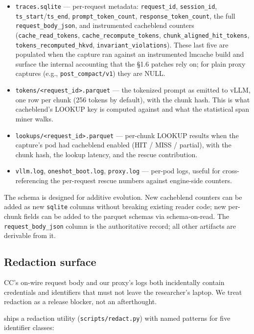 \begin{itemize}
\item \texttt{traces.sqlite} --- per-request metadata: \texttt{request\_id},
  \texttt{session\_id}, \texttt{ts\_start}/\texttt{ts\_end},
  \texttt{prompt\_token\_count}, \texttt{response\_token\_count}, the
  full \texttt{request\_body\_json}, and instrumented cacheblend
  counters (\texttt{cache\_read\_tokens},
  \texttt{cache\_recompute\_tokens},
  \texttt{chunk\_aligned\_hit\_tokens},
  \texttt{tokens\_recomputed\_hkvd},
  \texttt{invariant\_violations}). These last five are populated when
  the capture ran against an instrumented lmcache build and surface the
  internal accounting that the §1.6 patches rely on; for plain proxy
  captures (e.g., \texttt{post\_compact/v1}) they are NULL.
\item \texttt{tokens/<request\_id>.parquet} --- the tokenized prompt as
  emitted to vLLM, one row per chunk (256 tokens by default), with the
  chunk hash. This is what cacheblend's LOOKUP key is computed against
  and what the statistical span miner walks.
\item \texttt{lookups/<request\_id>.parquet} --- per-chunk LOOKUP
  results when the capture's pod had cacheblend enabled (HIT / MISS /
  partial), with the chunk hash, the lookup latency, and the rescue
  contribution.
\item \texttt{vllm.log}, \texttt{oneshot\_boot.log},
  \texttt{proxy.log} --- per-pod logs, useful for cross-referencing
  the per-request rescue numbers against engine-side counters.
\end{itemize}

The schema is designed for additive evolution. New cacheblend
counters can be added as new \texttt{sqlite} columns without breaking
existing reader code; new per-chunk fields can be added to the parquet
schemas via schema-on-read. The \texttt{request\_body\_json} column is
the authoritative record; all other artifacts are derivable from it.

\subsection{Redaction surface}
\label{sec:dataset-redact}

CC's on-wire request body and our proxy's logs both incidentally
contain credentials and identifiers that must not leave the
researcher's laptop. We treat redaction as a release blocker, not an
afterthought.

\sys{} ships a redaction utility (\texttt{scripts/redact.py}) with
named patterns for five identifier classes:

